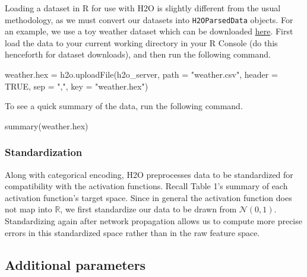 \documentclass[11pt]{article}
\begin{document}
Loading a dataset in R for use with H2O is slightly different from the usual methodology, as we must convert our datasets into \texttt{H2OParsedData} objects. For an example, we use a toy weather dataset which can be downloaded \href{https://raw.githubusercontent.com/0xdata/h2o/master/smalldata/weather.csv}{here}. First load the data to your current working directory in your R Console (do this henceforth for dataset downloads), and then run the following command.
\begin{spverbatim}
weather.hex = h2o.uploadFile(h2o_server, path = "weather.csv", header = TRUE, sep = ",", key = "weather.hex")
\end{spverbatim}
\bigskip
\noindent
To see a quick summary of the data, run the following command.
\begin{spverbatim}
summary(weather.hex)
\end{spverbatim}

\subsubsection{Standardization} \label{2.5.1}

Along with categorical encoding, H2O preprocesses data to be standardized for compatibility with the activation functions. Recall Table 1's summary of each activation function's target space. Since in general the activation function does not map into $\mathbb{R}$, we first standardize our data to be drawn from $\mathcal{N}(0,1)$. Standardizing again after network propagation allows us to compute more precise errors in this standardized space rather than in the raw feature space. 

\subsection{Additional parameters} \label{2.6}
\end{document}
